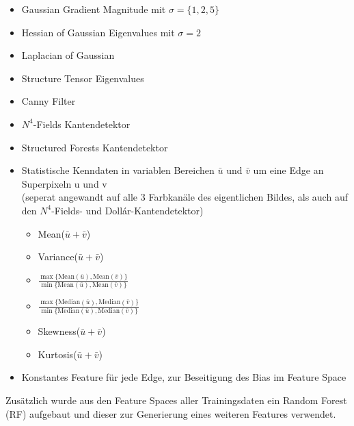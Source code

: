 \begin{itemize}
	\item Gaussian Gradient Magnitude mit $\sigma=\{1, 2, 5\}$
	\item Hessian of Gaussian Eigenvalues mit $\sigma=2$
	\item Laplacian of Gaussian
	\item Structure Tensor Eigenvalues
	\item Canny Filter
	\item $N^4$-Fields Kantendetektor \cite{n4}
	\item Structured Forests Kantendetektor \cite[Dollár et al.]{dollar}
	\item Statistische Kenndaten in variablen Bereichen $\bar{u}$ und $\bar{v}$ um eine Edge an Superpixeln u und v \\
	(seperat angewandt auf alle 3 Farbkanäle des eigentlichen Bildes, als auch auf den $N^4$-Fields- und Dollár-Kantendetektor)
	\begin{itemize}
		\item Mean($\bar{u} + \bar{v}$)
		\item Variance($\bar{u} + \bar{v}$)
		\item $\frac{\max{\{\text{Mean}(\bar{u}), \text{Mean}(\bar{v}) \}}}{\min{\{\text{Mean}(\bar{u}), \text{Mean}(\bar{v})}\}}$
		\item $\frac{\max{\{\text{Median}(\bar{u}), \text{Median}(\bar{v}) \}}}{\min{\{\text{Median}(\bar{u}), \text{Median}(\bar{v})}\}}$
		\item Skewness($\bar{u} + \bar{v}$)
		\item Kurtosis($\bar{u} + \bar{v}$)
	\end{itemize}
	\item Konstantes Feature für jede Edge, zur Beseitigung des Bias im Feature Space
\end{itemize}

Zusätzlich wurde aus den Feature Spaces aller Trainingsdaten ein Random Forest (RF) aufgebaut und dieser zur Generierung eines weiteren Features verwendet.







